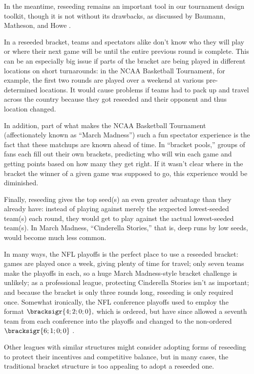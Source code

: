 {    

    In the meantime, reseeding remains an important tool in our tournament design toolkit, though it is not without its drawbacks, as discussed by Baumann, Matheson, and Howe \cite{reseeding_issues}. 

    In a reseeded bracket, teams and spectators alike don't know who they will play or where their next game will be until the entire previous round is complete. This can be an especially big issue if parts of the bracket are being played in different locations on short turnarounds: in the NCAA Basketball Tournament, for example, the first two rounds are played over a weekend at various pre-determined locations. It would cause problems if teams had to pack up and travel across the country because they got reseeded and their opponent and thus location changed.

    In addition, part of what makes the NCAA Basketball Tournament (affectionately known as ``March Madness'') such a fun spectator experience is the fact that these matchups are known ahead of time. In ``bracket pools,'' groups of fans each fill out their own brackets, predicting who will win each game and getting points based on how many they get right. If it wasn't clear where in the bracket the winner of a given game was supposed to go, this experience would be diminished.

    Finally, reseeding gives the top seed(s) an even greater advantage than they already have: instead of playing against merely the \i{expected} lowest-seeded team(s) each round, they would get to play against the \i{actual} lowest-seeded team(s). In March Madness, ``Cinderella Stories,'' that is, deep runs by low seeds, would become much less common.

    In many ways, the NFL playoffs is the perfect place to use a reseeded bracket: games are played once a week, giving plenty of time for travel; only seven teams make the playoffs in each, so a huge March Madness-style bracket challenge is unlikely; as a professional league, protecting Cinderella Stories isn't as important; and because the bracket is only three rounds long, reseeding is only required once. Somewhat ironically, the NFL conference playoffs used to employ the format $\bracksigr{4;2;0;0},$ which is ordered, but have since allowed a seventh team from each conference into the playoffs and changed to the non-ordered $\bracksigr{6;1;0;0}$ \cite{stor_nfl_exp}.

    Other leagues with similar structures might consider adopting forms of reseeding to protect their incentives and competitive balance, but in many cases, the traditional bracket structure is too appealing to adopt a reseeded one.
    }